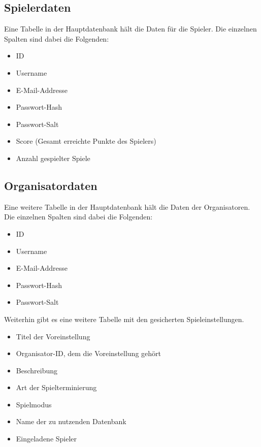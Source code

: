 \documentclass[a4paper]{scrreprt}
\begin{document}
    \subsection{Spielerdaten}
    Eine Tabelle in der Hauptdatenbank hält die Daten für die Spieler.
    Die einzelnen Spalten sind dabei die Folgenden:
    \begin{itemize}
        \item ID
        \item Username
        \item E-Mail-Addresse
        \item Passwort-Hash
        \item Passwort-Salt
        \item Score (Gesamt erreichte Punkte des Spielers)
        \item Anzahl gespielter Spiele
    \end{itemize}
    \subsection{Organisatordaten}
    Eine weitere Tabelle in der Hauptdatenbank hält die Daten der Organisatoren.
    Die einzelnen Spalten sind dabei die Folgenden:
    \begin{itemize}
        \item ID
        \item Username
        \item E-Mail-Addresse
        \item Passwort-Hash
        \item Passwort-Salt
    \end{itemize}
    Weiterhin gibt es eine weitere Tabelle mit den gesicherten Spieleinstellungen.
    \begin{itemize}
        \item Titel der Voreinstellung
        \item Organisator-ID, dem die Voreinstellung gehört
        \item Beschreibung
        \item Art der Spielterminierung
        \item Spielmodus
        \item Name der zu nutzenden Datenbank
        \item Eingeladene Spieler
    \end{itemize}
\end{document}
